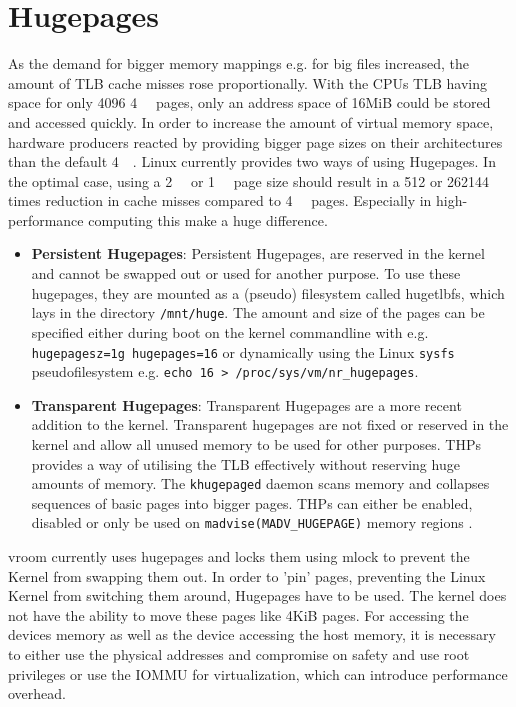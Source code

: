 \section{Hugepages}
As the demand for bigger memory mappings e.g. for big files increased, the amount of TLB cache misses rose proportionally. With the CPUs TLB having space for only 4096 \qty{4}{\kibi\byte} pages, only an address space of 16MiB could be stored and accessed quickly. In order to increase the amount of virtual memory space, hardware producers reacted by providing bigger page sizes on their architectures than the default \qty{4}{\kibi\byte}.
Linux currently provides two ways of using Hugepages.
In the optimal case, using a \qty{2}{\mebi\byte} or \qty{1}{\gibi\byte} page size should result in a 512 or 262144 times reduction in cache misses compared to \qty{4}{\kibi\byte} pages. Especially in high-performance computing this make a huge difference.

\begin{itemize}
    \item \textbf{Persistent Hugepages}: Persistent Hugepages, are reserved in the kernel and cannot be swapped out or used for another purpose. To use these hugepages, they are mounted as a (pseudo) filesystem called hugetlbfs, which lays in the directory \texttt{/mnt/huge}. The amount and size of the pages can be specified either during boot on the kernel commandline with e.g. \texttt{hugepagesz=1g hugepages=16} or dynamically using the Linux \texttt{sysfs} pseudofilesystem e.g. \texttt{echo 16 > /proc/sys/vm/nr\_hugepages}\cite{hugetlbkerneldocs}.
    \item \textbf{Transparent Hugepages}: Transparent Hugepages are a more recent addition to the kernel. Transparent hugepages are not fixed or reserved in the kernel and allow all unused memory to be used for other purposes. THPs provides a way of utilising the TLB effectively without reserving huge amounts of memory. The \texttt{khugepaged} daemon scans memory and collapses sequences of basic pages into bigger pages. THPs can either be enabled, disabled or only be used on \texttt{madvise(MADV\_HUGEPAGE)} memory regions \cite{transhugekerneldocs}.
\end{itemize}

vroom currently uses hugepages and locks them using mlock to prevent the Kernel from swapping them out. In order to 'pin' pages, preventing the Linux Kernel from switching them around, Hugepages have to be used. The kernel does not have the ability to move these pages like 4KiB pages.
For accessing the devices memory as well as the device accessing the host memory, it is necessary to either use the physical addresses and compromise on safety and use root privileges or use the IOMMU for virtualization, which can introduce performance overhead.

